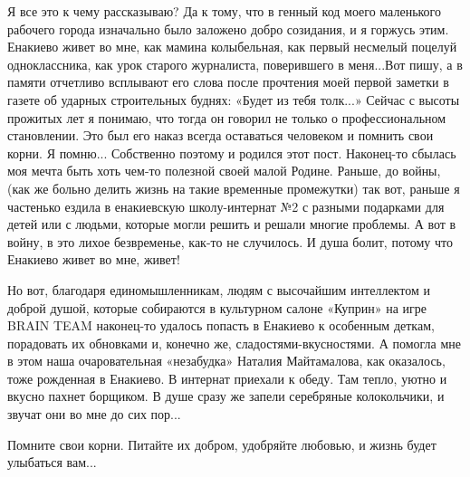 Я все это к чему рассказываю? Да к тому, что в генный код моего маленького
рабочего города изначально было заложено добро созидания, и я горжусь этим.
Енакиево живет во мне, как мамина колыбельная, как первый несмелый поцелуй
одноклассника, как урок старого журналиста, поверившего в меня...Вот пишу, а в
памяти отчетливо всплывают его слова после прочтения моей первой заметки в
газете об ударных строительных буднях: «Будет из тебя толк...» Сейчас с высоты
прожитых лет я понимаю, что тогда он говорил не только о профессиональном
становлении. Это был его наказ всегда оставаться человеком и помнить свои
корни. Я помню... Собственно поэтому и родился этот пост. Наконец-то сбылась
моя мечта быть хоть чем-то полезной своей малой Родине. Раньше, до войны, (как
же больно делить жизнь на такие временные промежутки) так вот, раньше я
частенько ездила в енакиевскую школу-интернат №2 с разными подарками для детей
или с людьми, которые могли решить и решали многие проблемы. А вот в войну, в
это лихое безвременье, как-то не случилось. И душа болит, потому что Енакиево
живет во мне, живет!

Но вот, благодаря единомышленникам, людям с высочайшим интеллектом и доброй
душой, которые собираются в культурном салоне «Куприн» на игре BRAIN TEAM
наконец-то удалось попасть в Енакиево к особенным деткам, порадовать их
обновками и, конечно же, сладостями-вкусностями. А помогла мне в этом наша
очаровательная «незабудка» Наталия Майтамалова, как оказалось, тоже рожденная в
Енакиево. В интернат приехали к обеду. Там тепло, уютно и вкусно пахнет
борщиком. В душе сразу же запели серебряные колокольчики, и звучат они во мне
до сих пор...

Помните свои корни. Питайте их добром, удобряйте любовью, и жизнь будет
улыбаться вам...


